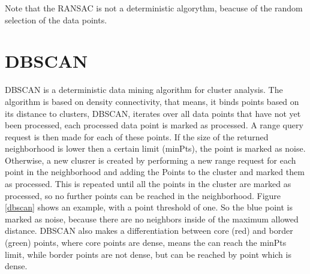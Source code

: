 Note that the \ac{RANSAC} is not a deterministic algorythm, beacuse of the random selection of the data points.

\section{\acl{DBSCAN}}

\ac{DBSCAN} \cite{DBSCAN} is a deterministic data mining algorithm for cluster analysis. The algorithm is based on density connectivity,
that means, it binds points based on its distance to clusters, \ac {DBSCAN}, iterates over all data points that have not yet been processed, 
each processed data point is marked as processed. A range query request is then made for each of these points. If the size of the returned neighborhood is lower then a certain limit (minPts),
the point is marked as noise. Otherwise, a new clusrer is created by performing a new range request for each point in the neighborhood 
and adding the Points to the cluster and marked them as processed. This is repeated until all the points in the cluster are marked as processed, so no further points can be reached in the neighborhood.
Figure \ref{dbscan} shows an example, with a point threshold of one. So the blue point is marked as noise, because there are no neighbors inside of the maximum allowed distance.
\ac{DBSCAN} also makes a differentiation between core (red) and border (green) points, where core points are dense, means the can reach the minPts limit, while border points are not dense, but can be reached by
point which is dense.

